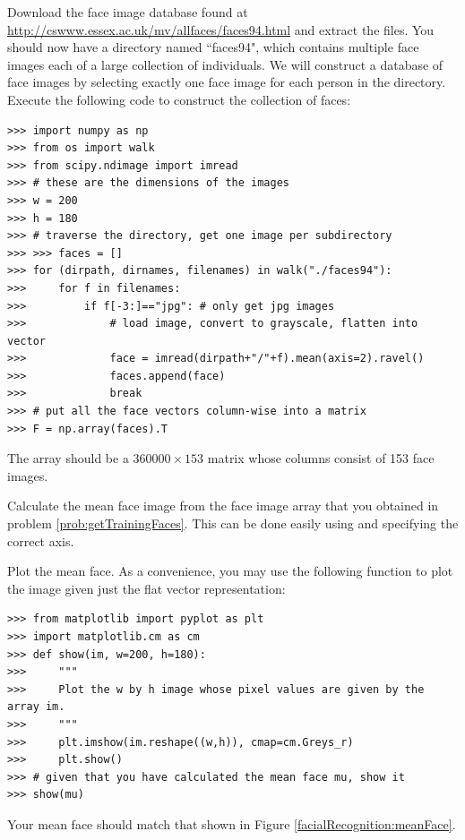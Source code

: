 \begin{problem}
\label{prob:getTrainingFaces}
Download the  face image database found at \url{http://cswww.essex.ac.uk/mv/allfaces/faces94.html} and extract the files.
You should now have a directory named ``faces94", which contains multiple face images each of a large collection of individuals.
We will construct a database of face images by selecting exactly one face image for each person in the directory.
Execute the following code to construct the collection of faces:
\begin{lstlisting}
>>> import numpy as np
>>> from os import walk
>>> from scipy.ndimage import imread
>>> # these are the dimensions of the images
>>> w = 200
>>> h = 180
>>> # traverse the directory, get one image per subdirectory
>>> >>> faces = []
>>> for (dirpath, dirnames, filenames) in walk("./faces94"):
>>>     for f in filenames:
>>>         if f[-3:]=="jpg": # only get jpg images
>>>             # load image, convert to grayscale, flatten into vector
>>>             face = imread(dirpath+"/"+f).mean(axis=2).ravel()
>>>             faces.append(face)
>>>             break
>>> # put all the face vectors column-wise into a matrix
>>> F = np.array(faces).T
\end{lstlisting}
The array  should be a $360000 \times 153$ matrix whose columns consist of 153 face images.
\end{problem}
\begin{problem}
\label{prob:meanFace}
Calculate the mean face image  from the face image array  that you obtained in problem \ref{prob:getTrainingFaces}.
This can be done easily using  and specifying the correct axis.

Plot the mean face.
As a convenience, you may use the following function to plot the image given just the flat vector representation:
\begin{lstlisting}
>>> from matplotlib import pyplot as plt
>>> import matplotlib.cm as cm
>>> def show(im, w=200, h=180):
>>>     """
>>>     Plot the w by h image whose pixel values are given by the array im.
>>>     """
>>>     plt.imshow(im.reshape((w,h)), cmap=cm.Greys_r)
>>>     plt.show()
>>> # given that you have calculated the mean face mu, show it
>>> show(mu)
\end{lstlisting}
Your mean face should match that shown in Figure \ref{facialRecognition:meanFace}.
\end{problem}
